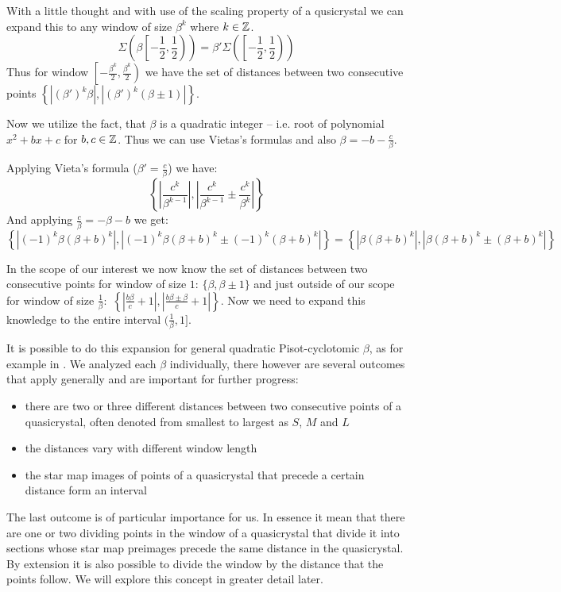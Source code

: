 \documentclass[text.tex]{subfiles}
\begin{document}
With a little thought and with use of the scaling property of a qusicrystal we can expand this to any window of size $\beta^k$ where $k\in\mathbb{Z}$. 
$$\Sigma\left(\beta\left[-\frac{1}{2}, \frac{1}{2}\right)\right) = \beta'\Sigma\left(\left[-\frac{1}{2}, \frac{1}{2}\right)\right)$$%
Thus for window $\left[-\frac{\beta^k}{2}, \frac{\beta^k}{2}\right)$ we have the set of distances between two consecutive points $\left\{\left|(\beta')^k\beta\right|, \left|(\beta')^k(\beta \pm 1)\right|\right\}$. %

Now we utilize the fact, that $\beta$ is a quadratic integer -- i.e. root of polynomial $x^2+bx+c$ for $b,c\in\mathbb{Z}$. Thus we can use Vietas's formulas and also $\beta = -b-\frac{c}{\beta}$. 

Applying Vieta's formula ($\beta' = \frac{c}{\beta}$) we have:
$$\left\{\left|\frac{c^k}{\beta^{k-1}}\right|, \left|\frac{c^k}{\beta^{k-1}}\pm\frac{c^k}{\beta^{k}}\right|\right\}$$
And applying $\frac{c}{\beta}=-\beta-b$ we get:
$$\left\{\left|(-1)^k\beta(\beta+b)^k\right|, \left|(-1)^k\beta(\beta+b)^k\pm(-1)^k(\beta+b)^k\right|\right\} = \left\{\left|\beta(\beta+b)^k\right|, \left|\beta(\beta+b)^k\pm(\beta+b)^k\right|\right\}$$

In the scope of our interest we now know the set of distances between two consecutive points for window of size $1$: $\{\beta, \beta \pm 1\}$ and just outside of our scope for window of size $\frac{1}{\beta}$:~$\left\{\left|\frac{b\beta}{c}+1\right|, \left|\frac{b\beta\pm\beta}{c} + 1\right|\right\}$. Now we need to expand this knowledge to the entire interval $(\frac{1}{\beta},1]$. %

It is possible to do this expansion for general quadratic Pisot-cyclotomic $\beta$, as for example in \cite{distances}. We analyzed each $\beta$ individually, there however are several outcomes that apply generally and are important for further progress: 
\begin{itemize}
\item there are two or three different distances between two consecutive points of a quasicrystal, often denoted from smallest to largest as $S$, $M$ and $L$
\item the distances vary with different window length
\item the star map images of points of a quasicrystal that precede a certain distance form an interval
\end{itemize}

The last outcome is of particular importance for us. In essence it mean that there are one or two dividing points in the window of a quasicrystal that divide it into sections whose star map preimages precede the same distance in the quasicrystal. By extension it is also possible to divide the window by the distance that the points follow. We will explore this concept in greater detail later. 
\end{document}
